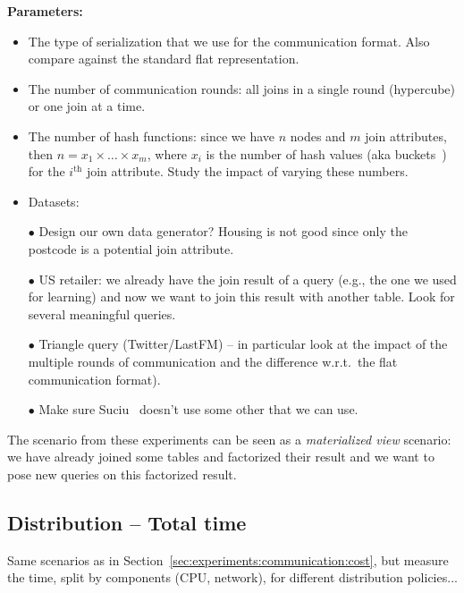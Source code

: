 {\bf Parameters:}
\begin{itemize}
\item The type of serialization that we use for the communication format.
Also compare against the standard flat representation.

\item The number of communication rounds: all joins in a single round (hypercube) or one join at a time.

\item The number of hash functions: since we have $n$ nodes and $m$ join attributes, then $n=x_1\times\ldots\times x_m$, where $x_i$ is the number of hash values (aka buckets~\cite{AfUl11}) for the $i^{\mathrm{th}}$ join attribute.
Study the impact of varying these numbers.

\item Datasets:

$\bullet$ Design our own data generator? 
Housing is not good since only the postcode is a potential join attribute.

$\bullet$ US retailer: we already have the join result of a query (e.g., the one we used for learning) and now we want to join this result with another table.
Look for several meaningful queries.

$\bullet$ Triangle query (Twitter/LastFM) -- in particular look at the impact of the multiple rounds of communication and the difference w.r.t.\ the flat communication format).

$\bullet$ Make sure Suciu~\cite{ChBaSu15} doesn't use some other that we can use.
\end{itemize}
The scenario from these experiments can be seen as a {\em materialized view} scenario: we have already joined some tables and factorized their result and we want to pose new queries on this factorized result.


\subsection{Distribution -- Total time}\label{sec:experiments:time}
\todo{}
Same scenarios as in Section~\ref{sec:experiments:communication:cost}, but measure the time, split by components (CPU, network), for different distribution policies...
